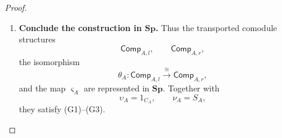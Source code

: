 \documentclass[oneside]{article}
\newcommand{\Sp}{\mathbf{Sp}}
\theoremstyle{plain}
\theoremstyle{definition}
\theoremstyle{remark}
\begin{document}
\begin{proof}
\begin{enumerate}[beginpenalty=10000]
        By the transport of \(\upsilon_{\mathrm{PS}}\) to \(\upsilon_A\), naturality of the braiding, and~\eqref{eq:cgqg-varsigma-transport-intertwining},
        \begin{align*}
            &
            I_A
            (1_{C_A}\otimes1_{C_A}\otimes\upsilon_A)
            c_{C_A,C_A\otimes C_A}
            \varsigma_A
            \\
            &\qquad=
            (1\otimes1\otimes\upsilon_{\mathrm{PS}})
            c\,
            \varsigma_{\mathrm{PS}}j_A.
        \end{align*}
        The Pastro--Street \textup{(G3)} equation gives
        \[
            (1\otimes1\otimes\upsilon_{\mathrm{PS}})
            c\,
            \varsigma_{\mathrm{PS}}j_A
            =
            \varsigma_{\mathrm{PS}}
            \theta_{\mathrm{PS}}j_A.
        \]
        Using~\eqref{eq:cgqg-theta-transport-intertwining} and then~\eqref{eq:cgqg-varsigma-transport-intertwining},
        \begin{align*}
            \varsigma_{\mathrm{PS}}
            \theta_{\mathrm{PS}}j_A
            &=
            \varsigma_{\mathrm{PS}}j_A\theta_A
            \\
            &=
            I_A\varsigma_A\theta_A.
        \end{align*}
        Hence
        \[
            I_A
            (1_{C_A}\otimes1_{C_A}\otimes\upsilon_A)
            c_{C_A,C_A\otimes C_A}
            \varsigma_A
            =
            I_A\varsigma_A\theta_A.
        \]
        Since \(I_A\) is split monic, cancellation gives
        \[
            (1_{C_A}\otimes1_{C_A}\otimes\upsilon_A)
            c_{C_A,C_A\otimes C_A}
            \varsigma_A
            =
            \varsigma_A\theta_A.
        \]
        This is precisely \textup{(G3)}.

        \item \textbf{Conclude the construction in \(\Sp\).} Thus the transported comodule structures
        \[
            \mathsf{Comp}_{A,l},
            \qquad
            \mathsf{Comp}_{A,r},
        \]
        the isomorphism
        \[
            \theta_A:
            \mathsf{Comp}_{A,l}
            \xrightarrow{\cong}
            \mathsf{Comp}_{A,r},
        \]
        and the map \(\varsigma_A\) are represented in \(\Sp\). Together with
        \[
            \upsilon_A=1_{C_A},
            \qquad
            \nu_A=S_A,
        \]
        they satisfy \textup{(G1)--(G3)}. \qedhere
    \end{enumerate}
\end{proof}
\end{document}

